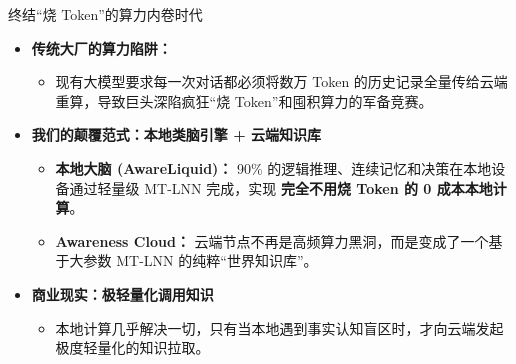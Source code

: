 ﻿\documentclass[aspectratio=169, 10pt]{beamer}
\begin{document}
\begin{frame}{终结“烧 Token”的算力内卷时代}
\begin{itemize}
    \item \textbf{传统大厂的算力陷阱：} 
    \begin{itemize}
        \item 现有大模型要求每一次对话都必须将数万 Token 的历史记录全量传给云端重算，导致巨头深陷疯狂“烧 Token”和囤积算力的军备竞赛。
    \end{itemize}
    \vspace{0.4em}
    \item \textbf{我们的颠覆范式：本地类脑引擎 + 云端知识库}
    \begin{itemize}
        \item \textbf{本地大脑 (AwareLiquid)：} 90\% 的逻辑推理、连续记忆和决策在本地设备通过轻量级 MT-LNN 完成，实现 \textbf{完全不用烧 Token 的 0 成本本地计算}。
        \item \textbf{Awareness Cloud：} 云端节点不再是高频算力黑洞，而是变成了一个基于大参数 MT-LNN 的纯粹“世界知识库”。
    \end{itemize}
    \vspace{0.4em}
    \item \textbf{商业现实：极轻量化调用知识} 
    \begin{itemize}
        \item 本地计算几乎解决一切，只有当本地遇到事实认知盲区时，才向云端发起极度轻量化的知识拉取。
    \end{itemize}
\end{itemize}
\end{frame}
\end{document}
